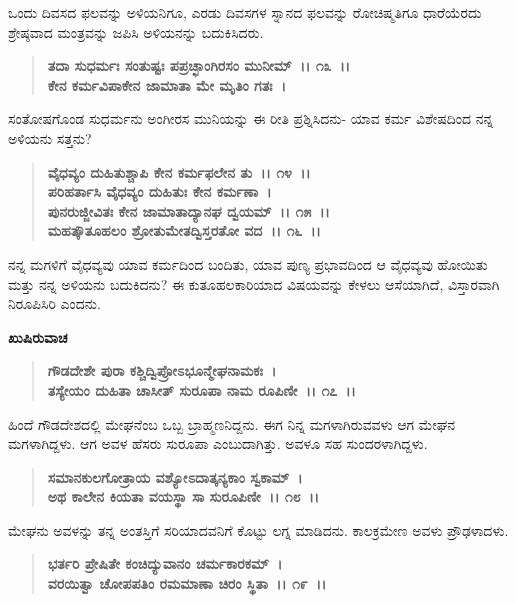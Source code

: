 ಒಂದು ದಿವಸದ ಫಲವನ್ನು ಅಳಿಯನಿಗೂ, ಎರಡು ದಿವಸಗಳ ಸ್ನಾನದ ಫಲವನ್ನು ರೋಚಿಷ್ಮತಿಗೂ ಧಾರೆಯೆರದು ಶ್ರೇಷ್ಠವಾದ ಮಂತ್ರವನ್ನು ಜಪಿಸಿ ಅಳಿಯನನ್ನು ಬದುಕಿಸಿದರು.

\begin{verse}
\textbf{ತದಾ ಸುಧರ್ಮಃ ಸಂತುಷ್ಟಃ ಪಪ್ರಚ್ಛಾಂಗಿರಸಂ ಮುನೀಮ್~।। ೧೩~।।}\\\textbf{ಕೇನ ಕರ್ಮವಿಪಾಕೇನ ಜಾಮಾತಾ ಮೇ ಮೃತಿಂ ಗತಃ~।}
\end{verse}

ಸಂತೋಷಗೊಂಡ ಸುಧರ್ಮನು ಅಂಗೀರಸ ಮುನಿಯನ್ನು ಈ ರೀತಿ ಪ್ರಶ್ನಿಸಿದನು- ಯಾವ ಕರ್ಮ ವಿಶೇಷದಿಂದ ನನ್ನ ಅಳಿಯನು ಸತ್ತನು?

\begin{verse}
\textbf{ವೈಧವ್ಯಂ ದುಹಿತುಶ್ಚಾಪಿ ಕೇನ ಕರ್ಮಫಲೇನ ತು~।। ೧೪~।।}\\\textbf{ಪರಿಹರ್ತಾಸಿ ವೈಧವ್ಯಂ ದುಹಿತುಃ ಕೇನ ಕರ್ಮಣಾ~।}\\\textbf{ಪುನರುಜ್ಜೀವಿತಃ ಕೇನ ಜಾಮಾತಾದ್ಯಾನಘ ದ್ವಯಮ್~।। ೧೫~।।}\\\textbf{ಮಹತ್ಕೌತೂಹಲಂ ಶ್ರೋತುಮೇತದ್ವಿಸ್ತರತೋ ವದ~।। ೧೬~।।}
\end{verse}

ನನ್ನ ಮಗಳಿಗೆ ವೈಧವ್ಯವು ಯಾವ ಕರ್ಮದಿಂದ ಬಂದಿತು, ಯಾವ ಪುಣ್ಯ ಪ್ರಭಾವದಿಂದ ಆ ವೈಧವ್ಯವು ಹೋಯಿತು ಮತ್ತು ನನ್ನ ಅಳಿಯನು ಬದುಕಿದನು? ಈ ಕುತೂಹಲಕಾರಿಯಾದ ವಿಷಯವನ್ನು ಕೇಳಲು ಆಸೆಯಾಗಿದೆ, ವಿಸ್ತಾರವಾಗಿ ನಿರೂಪಿಸಿರಿ ಎಂದನು.

\newpage

\begin{flushleft}
\textbf{ಖುಷಿರುವಾಚ\enginline{-}}
\end{flushleft}

\begin{verse}
\textbf{ಗೌಡದೇಶೇ ಪುರಾ ಕಶ್ಚಿದ್ವಿಪ್ರೋಽಭೂನ್ಮೇಘನಾಮಕಃ~।}\\\textbf{ತಸ್ಯೇಯಂ ದುಹಿತಾ ಚಾಸೀತ್ ಸುರೂಪಾ ನಾಮ ರೂಪಿಣೀ~।। ೧೭~।।}
\end{verse}

ಹಿಂದೆ ಗೌಡದೇಶದಲ್ಲಿ ಮೇಘನೆಂಬ ಒಬ್ಬ ಬ್ರಾಹ್ಮಣನಿದ್ದನು. ಈಗ ನಿನ್ನ ಮಗಳಾಗಿರುವವಳು ಆಗ ಮೇಘನ ಮಗಳಾಗಿದ್ದಳು. ಆಗ ಅವಳ ಹೆಸರು ಸುರೂಪಾ ಎಂಬುದಾಗಿತ್ತು. ಅವಳೂ ಸಹ ಸುಂದರಳಾಗಿದ್ದಳು.

\begin{verse}
\textbf{ಸಮಾನಕುಲಗೋತ್ರಾಯ ವಶ್ಯೋಽದಾತ್ಕನ್ಯಕಾಂ ಸ್ವಕಾಮ್~।}\\\textbf{ಅಥ ಕಾಲೇನ ಕಿಯತಾ ವಯಸ್ಥಾ ಸಾ ಸುರೂಪಿಣೀ~।। ೧೮~।।}
\end{verse}

ಮೇಘನು ಅವಳನ್ನು ತನ್ನ ಅಂತಸ್ತಿಗೆ ಸರಿಯಾದವನಿಗೆ ಕೊಟ್ಟು ಲಗ್ನ ಮಾಡಿದನು. ಕಾಲಕ್ರಮೇಣ ಅವಳು ಪ್ರೌಢಳಾದಳು.

\begin{verse}
\textbf{ಭರ್ತರಿ ಪ್ರೇಷಿತೇ ಕಂಚಿದ್ಯುವಾನಂ ಚರ್ಮಕಾರಕಮ್~।}\\\textbf{ವರಯಿತ್ವಾ ಚೋಪಪತಿಂ ರಮಮಾಣಾ ಚಿರಂ ಸ್ಥಿತಾ~।। ೧೯~।।}
\end{verse}

